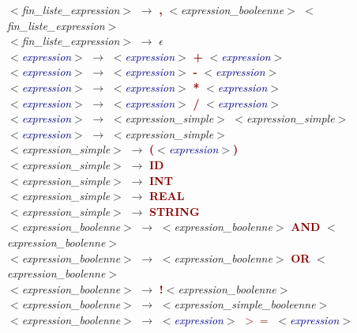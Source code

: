 \documentclass{article}
\newcommand{\blu}[1]{\textcolor{darkblue}{#1}}
\newcommand{\red}[1]{\textcolor{darkred}{#1}}
\begin{document}
\begin{center}
{\begin{minipage}{0.8\textwidth}
$<$\textit{fin\_liste\_expression}$>$ $\rightarrow$ \textbf{\red{,}} $<$\textit{expression\_booleenne}$>$ $<$\textit{fin\_liste\_expression}$>$\\
$<$\textit{fin\_liste\_expression}$>$ $\rightarrow$ $\epsilon$\\
$<$\textit{\blu{expression}}$>$ $\rightarrow$ $<$\textit{\blu{expression}}$>$ \textbf{\red{+}} $<$\textit{\blu{expression}}$>$\\
$<$\textit{\blu{expression}}$>$ $\rightarrow$ $<$\textit{\blu{expression}}$>$ \textbf{\red{-}} $<$\textit{\blu{expression}}$>$\\
$<$\textit{\blu{expression}}$>$ $\rightarrow$ $<$\textit{\blu{expression}}$>$ \textbf{\red{*}} $<$\textit{\blu{expression}}$>$\\
$<$\textit{\blu{expression}}$>$ $\rightarrow$ $<$\textit{\blu{expression}}$>$ \textbf{\red{/}} $<$\textit{\blu{expression}}$>$\\
$<$\textit{\blu{expression}}$>$ $\rightarrow$ $<$\textit{expression\_simple}$>$ $<$\textit{expression\_simple}$>$\\
$<$\textit{\blu{expression}}$>$ $\rightarrow$ $<$\textit{expression\_simple}$>$\\
$<$\textit{expression\_simple}$>$ $\rightarrow$ \textbf{\red{(}}$<$\textit{\blu{expression}}$>$\textbf{\red{)}}\\
$<$\textit{expression\_simple}$>$ $\rightarrow$ \textbf{\red{ID}} \\
$<$\textit{expression\_simple}$>$ $\rightarrow$ \textbf{\red{INT}}\\
$<$\textit{expression\_simple}$>$ $\rightarrow$ \textbf{\red{REAL}}\\
$<$\textit{expression\_simple}$>$ $\rightarrow$ \textbf{\red{STRING}}\\
$<$\textit{expression\_boolenne}$>$ $\rightarrow$ $<$\textit{expression\_boolenne}$>$ \textbf{\red{AND}} $<$\textit{expression\_boolenne}$>$\\
$<$\textit{expression\_boolenne}$>$ $\rightarrow$ $<$\textit{expression\_boolenne}$>$ \textbf{\red{OR}} $<$\textit{expression\_boolenne}$>$\\
$<$\textit{expression\_boolenne}$>$ $\rightarrow$ \textbf{\red{!}}$<$\textit{expression\_boolenne}$>$\\
$<$\textit{expression\_boolenne}$>$ $\rightarrow$ $<$\textit{expression\_simple\_booleenne}$>$\\
$<$\textit{expression\_boolenne}$>$ $\rightarrow$ $<$\textit{\blu{expression}}$>$ \red{\textbf{$>=$}} $<$\textit{\blu{expression}}$>$\\

\end{minipage}}
\end{center}
\end{document}
